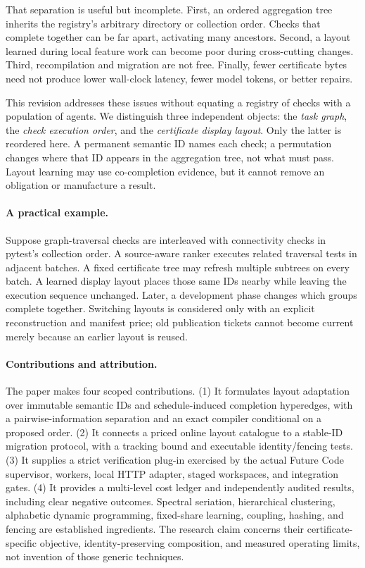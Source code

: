 \documentclass[11pt]{article}
\theoremstyle{definition}\newtheorem{definition}[theorem]{Definition}
\begin{document}
That separation is useful but incomplete. First, an ordered aggregation tree inherits the registry's arbitrary directory or collection order. Checks that complete together can be far apart, activating many ancestors. Second, a layout learned during local feature work can become poor during cross-cutting changes. Third, recompilation and migration are not free. Finally, fewer certificate bytes need not produce lower wall-clock latency, fewer model tokens, or better repairs.

This revision addresses these issues without equating a registry of checks with a population of agents. We distinguish three independent objects: the \emph{task graph}, the \emph{check execution order}, and the \emph{certificate display layout}. Only the latter is reordered here. A permanent semantic ID names each check; a permutation changes where that ID appears in the aggregation tree, not what must pass. Layout learning may use co-completion evidence, but it cannot remove an obligation or manufacture a result.

\paragraph{A practical example.}
Suppose graph-traversal checks are interleaved with connectivity checks in pytest's collection order. A source-aware ranker executes related traversal tests in adjacent batches. A fixed certificate tree may refresh multiple subtrees on every batch. A learned display layout places those same IDs nearby while leaving the execution sequence unchanged. Later, a development phase changes which groups complete together. Switching layouts is considered only with an explicit reconstruction and manifest price; old publication tickets cannot become current merely because an earlier layout is reused.

\paragraph{Contributions and attribution.}
The paper makes four scoped contributions. (1) It formulates layout adaptation over immutable semantic IDs and schedule-induced completion hyperedges, with a pairwise-information separation and an exact compiler conditional on a proposed order. (2) It connects a priced online layout catalogue to a stable-ID migration protocol, with a tracking bound and executable identity/fencing tests. (3) It supplies a strict verification plug-in exercised by the actual Future Code supervisor, workers, local HTTP adapter, staged workspaces, and integration gates. (4) It provides a multi-level cost ledger and independently audited results, including clear negative outcomes. Spectral seriation, hierarchical clustering, alphabetic dynamic programming, fixed-share learning, coupling, hashing, and fencing are established ingredients. The research claim concerns their certificate-specific objective, identity-preserving composition, and measured operating limits, not invention of those generic techniques.
\end{document}
